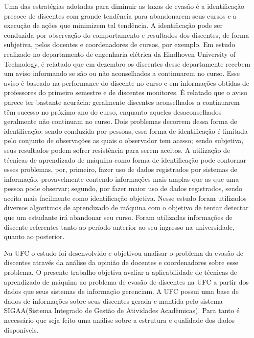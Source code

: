 Uma das estratégias adotadas para diminuir as taxas de evasão é a identificação precoce de discentes com grande tendência para abandonarem seus cursos e a execução de ações que minimizem tal tendência. A identificação pode ser conduzida por observação do comportamento e resultados dos discentes, de forma subjetiva, pelos docentes e coordenadores de cursos, por exemplo. Em estudo realizado no departamento de engenharia elétrica da Eindhoven University of Technology\cite{Predicting_Students}, é relatado que em dezembro os discentes desse departamente recebem um aviso informando se são ou não aconselhados a continuarem no curso. Esse aviso é baseado na performance do discente no curso e em informações obtidas de professores do primeiro semestre e de discentes monitores. É relatado que o aviso parece ter bastante acurácia: geralmente discentes aconselhados a continuarem têm sucesso no próximo ano do curso, enquanto aqueles desaconselhados geralmente não continuam no curso.
Dois problemas decorrem dessa forma de identificação: sendo conduzida por pessoas, essa forma de identificação é limitada pelo conjunto de observações as quais o observador tem acesso; sendo subjetiva, seus resultados podem sofrer resistência para serem aceitos. A utilização de técnicas de aprendizado de máquina como forma de identificação pode contornar esses problemas, por, primeiro, fazer uso de dados registrados por sistemas de informação, provavelmente contendo informações mais amplas que as que uma pessoa pode observar; segundo, por fazer maior uso de dados registrados, sendo aceita mais facilmente como identificação objetiva. Nesse estudo foram utilizados diversos algoritmos de aprendizado de máquina com o objetivo de tentar detectar que um estudante irá abandonar seu curso. Foram utilizadas informações de discente referentes tanto ao período anterior ao seu ingresso na universidade, quanto ao posterior.


Na UFC o estudo \cite{andriola} foi desenvolvido e objetivou analisar o problema da evasão de discentes através da análise da opinião de docentes e coordenadores sobre esse problema. O presente trabalho objetiva avaliar a aplicabilidade de técnicas de aprendizado de máquina ao problema de evasão de discentes na UFC a partir dos dados que seus sistemas de informação gerenciam. A UFC possui uma base de dados de informações sobre seus discentes gerada e mantida pelo sistema SIGAA(Sistema Integrado de Gestão de Atividades Acadêmicas). Para tanto é necessário que seja feito uma análise sobre a estrutura e qualidade dos dados disponíveis.


